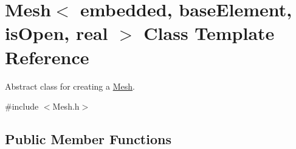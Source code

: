 \hypertarget{class_mesh}{\section{\-Mesh$<$ embedded, base\-Element, is\-Open, real $>$ \-Class \-Template \-Reference}
\label{class_mesh}
}


\-Abstract class for creating a \hyperlink{class_mesh}{\-Mesh}.  




{\ttfamily \#include $<$\-Mesh.\-h$>$}

\subsection*{\-Public \-Member \-Functions}
